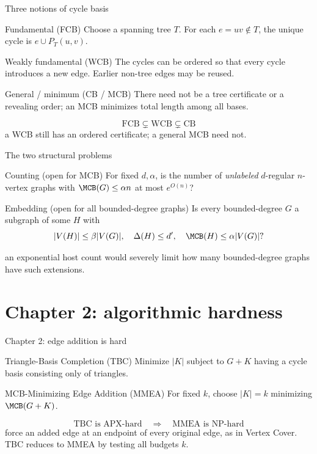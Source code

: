 \begin{frame}{Three notions of cycle basis}
 \begin{block}{Fundamental (FCB)}
 Choose a spanning tree $T$. For each $e=uv\notin T$, the unique cycle is $e\cup P_T(u,v)$.
 \end{block}
 \begin{block}{Weakly fundamental (WCB)}
 The cycles can be ordered so that every cycle introduces a new edge. Earlier non-tree edges may be reused.
 \end{block}
 \begin{block}{General / minimum (CB / MCB)}
 There need not be a tree certificate or a revealing order; an MCB minimizes total length among all bases.
 \end{block}
 \vspace{.1cm}
 \[\boxed{\mathrm{FCB}\subsetneq\mathrm{WCB}\subsetneq\mathrm{CB}}\]
 \small{} a WCB still has an ordered certificate; a general MCB need not.
\end{frame}


\begin{frame}{The two structural problems}
 \begin{block}{Counting (open for MCB)}
 For fixed $d,\alpha$, is the number of \emph{unlabeled} $d$-regular $n$-vertex graphs with $\MCB(G)\le\alpha n$ at most $e^{O(n)}$?
 \end{block}
 \begin{block}{Embedding (open for all bounded-degree graphs)}
 Is every bounded-degree $G$ a subgraph of some $H$ with
 \[|V(H)|\le\beta|V(G)|,\quad \Delta(H)\le d',\quad \MCB(H)\le\alpha|V(G)|?\]
 \end{block}
 \vspace{.2cm}
  an exponential host count would severely limit how many bounded-degree graphs have such extensions.
\end{frame}


\section{Chapter 2: algorithmic hardness}


\begin{frame}{Chapter 2: edge addition is hard}
 \begin{block}{Triangle-Basis Completion (TBC)}
 Minimize $|K|$ subject to $G+K$ having a cycle basis consisting only of triangles.
 \end{block}
 \begin{block}{MCB-Minimizing Edge Addition (MMEA)}
 For fixed $k$, choose $|K|=k$ minimizing $\MCB(G+K)$.
 \end{block}
 \[\boxed{\mathrm{TBC}\text{ is APX-hard}\quad\Longrightarrow\quad\mathrm{MMEA}\text{ is NP-hard}}\]
 \small{} force an added edge at an endpoint of every original edge, as in Vertex Cover. TBC reduces to MMEA by testing all budgets $k$.
\end{frame}



